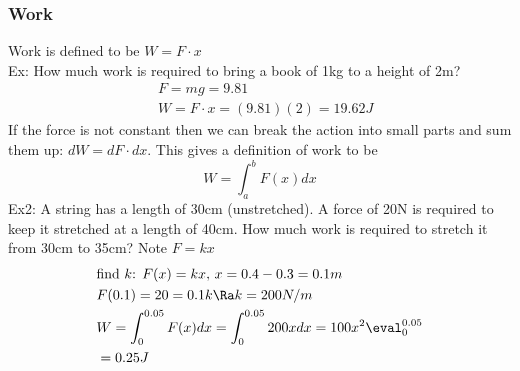 \subsubsection{Work}
Work is defined to be $W=F\cdot x$\\
Ex: How much work is required to bring a book of 1kg to a height of 2m?
\begin{align*}
    &F=mg=9.81\\
    &W=F\cdot x=(9.81)(2)=19.62J
\end{align*}
If the force is not constant then we can break the action into small parts and sum them up: $dW=dF\cdot dx$. This gives a definition of work to be
$$W=\int_a^bF(x)dx$$
Ex2: A string has a length of 30cm (unstretched). A force of 20N is required to keep it stretched at a length of 40cm. How much work is required to stretch it from 30cm to 35cm? Note $F=kx$
\begin{align*}
    &\text{find $k$: }F(x)=kx,\,x=0.4-0.3=0.1m\\
    &F(0.1)=20=0.1k\Ra k=200N/m\\
    &W=\int_0^{0.05}F(x)dx=\int_0^{0.05}200xdx={100x^2}\eval_0^{0.05}\\
    &=0.25J
\end{align*}

